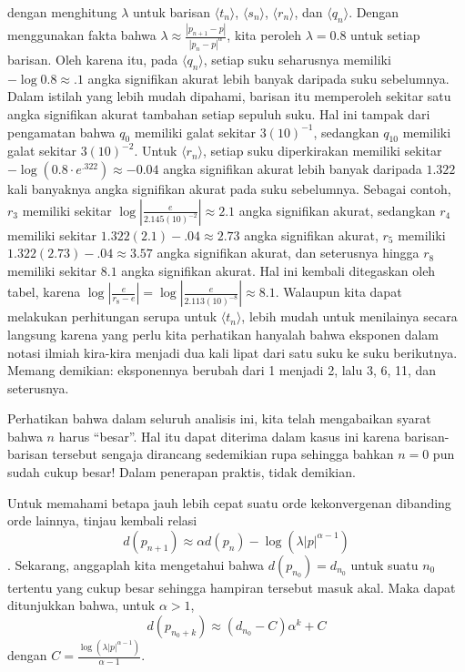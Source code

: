 dengan menghitung $\lambda$ untuk barisan $\langle t_{n}\rangle$,
$\langle s_{n}\rangle$, $\langle r_{n}\rangle$, dan $\langle q_{n}\rangle$.
Dengan menggunakan fakta bahwa $\lambda\approx\frac{\left|p_{n+1}-p\right|}{\left|p_{n}-p\right|^{\alpha}}$,
kita peroleh $\lambda=0.8$ untuk setiap barisan. Oleh karena itu,
pada $\langle q_{n}\rangle$, setiap suku seharusnya memiliki $-\log0.8\approx.1$
angka signifikan akurat lebih banyak daripada suku sebelumnya. Dalam
istilah yang lebih mudah dipahami, barisan itu memperoleh sekitar
satu angka signifikan akurat tambahan setiap sepuluh suku. Hal ini
tampak dari pengamatan bahwa $q_{0}$ memiliki galat sekitar $3(10)^{-1}$,
sedangkan $q_{10}$ memiliki galat sekitar $3(10)^{-2}$. Untuk $\langle r_{n}\rangle$,
setiap suku diperkirakan memiliki sekitar $-\log(0.8\cdot e^{.322})\approx-0.04$
angka signifikan akurat lebih banyak daripada $1.322$ kali banyaknya
angka signifikan akurat pada suku sebelumnya. Sebagai contoh, $r_{3}$
memiliki sekitar $\log\left|\frac{e}{2.145(10)^{-2}}\right|\approx2.1$
angka signifikan akurat, sedangkan $r_{4}$ memiliki sekitar $1.322(2.1)-.04\approx2.73$
angka signifikan akurat, $r_{5}$ memiliki $1.322(2.73)-.04\approx3.57$
angka signifikan akurat, dan seterusnya hingga $r_{8}$ memiliki sekitar
$8.1$ angka signifikan akurat. Hal ini kembali ditegaskan oleh tabel,
karena $\log\left|\frac{e}{r_{8}-e}\right|=\log\left|\frac{e}{2.113(10)^{-8}}\right|\approx8.1$.
Walaupun kita dapat melakukan perhitungan serupa untuk $\langle t_{n}\rangle$,
lebih mudah untuk menilainya secara langsung karena yang perlu kita
perhatikan hanyalah bahwa eksponen dalam notasi ilmiah kira-kira menjadi
dua kali lipat dari satu suku ke suku berikutnya. Memang demikian:
eksponennya berubah dari 1 menjadi 2, lalu 3, 6, 11, dan seterusnya. 

Perhatikan bahwa dalam seluruh analisis ini, kita telah mengabaikan
syarat bahwa $n$ harus ``besar''. Hal itu dapat diterima dalam
kasus ini karena barisan-barisan tersebut sengaja dirancang sedemikian
rupa sehingga bahkan $n=0$ pun sudah cukup besar! Dalam penerapan
praktis, tidak demikian.

Untuk memahami betapa jauh lebih cepat suatu orde kekonvergenan dibanding
orde lainnya, tinjau kembali relasi 
\[
d(p_{n+1})\approx\alpha d(p_{n})-\log\left(\lambda|p|^{\alpha-1}\right)
\]
. Sekarang, anggaplah kita mengetahui bahwa $d(p_{n_{0}})=d_{n_{0}}$
untuk suatu $n_{0}$ tertentu yang cukup besar sehingga hampiran tersebut
masuk akal. Maka dapat ditunjukkan bahwa, untuk $\alpha>1$, 
\[
d(p_{n_{0}+k})\approx(d_{n_{0}}-C)\alpha^{k}+C
\]
dengan ${\displaystyle C=\frac{\log\left(\lambda|p|^{\alpha-1}\right)}{\alpha-1}}$. 

